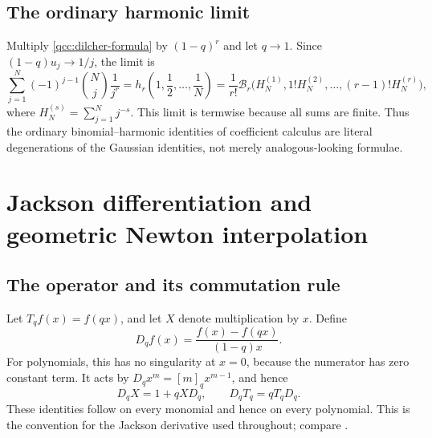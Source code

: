 \documentclass[11pt,a4paper,oneside,openany]{book}
\theoremstyle{definition}
\theoremstyle{remark}
\newcommand{\Y}[1]{\mathcal B_{#1}}
\begin{document}
\section{The ordinary harmonic limit}
Multiply \eqref{qcc:dilcher-formula} by \((1-q)^r\) and let \(q\to1\).
Since \((1-q)u_j\to1/j\), the limit is
\begin{equation}\label{qcc:harmonic-limit}
 \sum_{j=1}^N(-1)^{j-1}\binom Nj\frac1{j^r}
 =h_r\left(1,\frac12,\ldots,\frac1N\right)
 =\frac1{r!}\Y r\bigl(H_N^{(1)},1!H_N^{(2)},\ldots,(r-1)!H_N^{(r)}\bigr),
\end{equation}
where \(H_N^{(s)}=\sum_{j=1}^N j^{-s}\). This limit is termwise because all sums
are finite. Thus the ordinary binomial--harmonic identities of coefficient
calculus are literal degenerations of the Gaussian identities, not merely
analogous-looking formulae.

\chapter{Jackson differentiation and geometric Newton interpolation}
\label{qcc:jackson}
\section{The operator and its commutation rule}
Let \(T_qf(x)=f(qx)\), and let \(X\) denote multiplication by \(x\). Define
\begin{equation}\label{qcc:jackson-def}
 D_qf(x)=\frac{f(x)-f(qx)}{(1-q)x}.
\end{equation}
For polynomials, this has no singularity at \(x=0\), because the numerator has
zero constant term. It acts by
\(D_qx^m=[m]_qx^{m-1}\), and hence
\begin{equation}\label{qcc:q-weyl}
 D_qX=1+qXD_q,\qquad D_qT_q=qT_qD_q.
\end{equation}
These identities follow on every monomial and hence on every polynomial. This is
the convention for the Jackson derivative used throughout; compare
\cite{dlmf172}.
\end{document}
